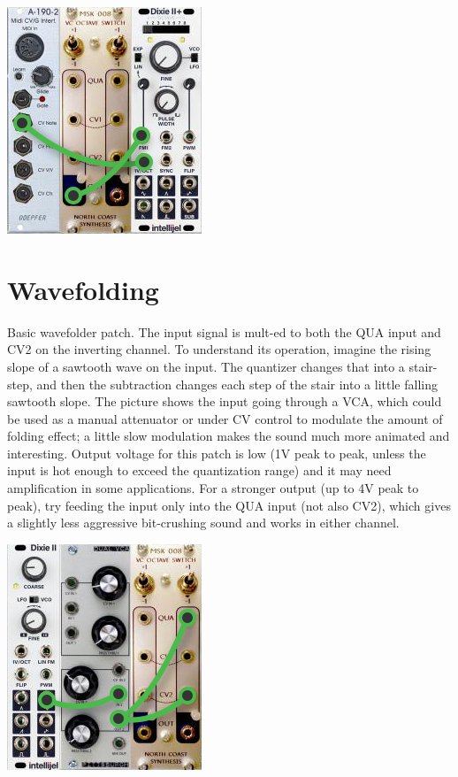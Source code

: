{\hspace*{\fill}\includegraphics[scale=0.8]{patch8.png}\hspace*{\fill}\par} 

\section{Wavefolding}

Basic wavefolder patch.  The input signal is mult-ed to both the QUA input
and CV2 on the inverting channel.  To understand its operation, imagine the
rising slope of a sawtooth wave on the input.  The quantizer changes that
into a stair-step, and then the subtraction changes each step of the stair
into a little falling sawtooth slope.  The picture shows the input going
through a VCA, which could be used as a manual attenuator or under CV
control to modulate the amount of folding effect; a little slow modulation
makes the sound much more animated and interesting.  Output voltage for this
patch is low (1V peak to peak, unless the input is hot enough to exceed the
quantization range) and it may need amplification in some applications.  For
a stronger output (up to 4V peak to peak), try feeding the input only into
the QUA input (not also CV2), which gives a slightly less aggressive
bit-crushing sound and works in either channel.

{\hspace*{\fill}\includegraphics[scale=0.8]{patch3.png}\hspace*{\fill}\par} 

